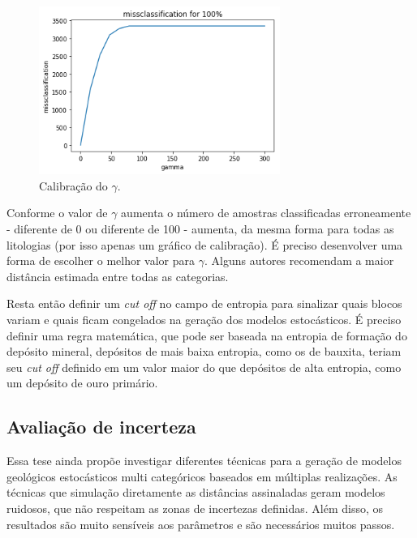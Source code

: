\begin{figure}[H]
	\caption{\label{calib_gamma}Calibração do $\gamma$.}
	\begin{center}
		\includegraphics[width=0.7\textwidth]{capitulo_3/calib100.png}
	\end{center}
\end{figure}

Conforme o valor de $\gamma$ aumenta o número de amostras classificadas erroneamente - diferente de 0 ou diferente de 100 - aumenta, da mesma forma para todas as litologias (por isso apenas um gráfico de calibração). É preciso desenvolver uma forma de escolher o melhor valor para $\gamma$. Alguns autores recomendam a maior distância estimada entre todas as categorias.

Resta então definir um \textit{cut off} no campo de entropia para sinalizar quais blocos variam e quais ficam congelados na geração dos modelos estocásticos. É preciso definir uma regra matemática, que pode ser baseada na entropia de formação do depósito mineral, depósitos de mais baixa entropia, como os de bauxita, teriam seu \textit{cut off} definido em um valor maior do que depósitos de alta entropia, como um depósito de ouro primário.

\subsection{Avaliação de incerteza}

Essa tese ainda propõe investigar diferentes técnicas para a geração de modelos geológicos estocásticos multi categóricos baseados em múltiplas realizações. As técnicas que simulação diretamente as distâncias assinaladas geram modelos ruidosos, que não respeitam as zonas de incertezas definidas. Além disso, os resultados são muito sensíveis aos parâmetros e são necessários muitos passos. 

